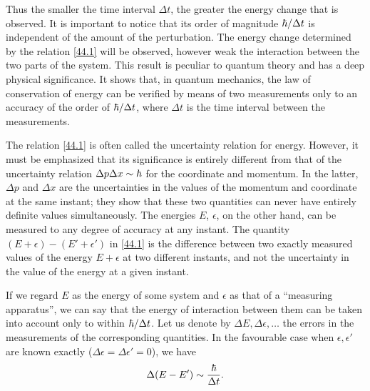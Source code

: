 Thus the smaller the time interval $ \Delta t $, the greater the energy change that is observed. It is important to notice that its order of magnitude $ \hbar/\Delta t $ is independent of the amount of the perturbation. The energy change determined by the relation \eqref{44.1} will be observed, however weak the interaction between the two parts of the system. This result is peculiar to quantum theory and has a deep physical significance. It shows that, in quantum mechanics, the law of conservation of energy can be verified by means of two measurements only to an accuracy of the order of $ \hbar/\Delta t $, where $ \Delta t $ is the time interval between the measurements.

The relation \eqref{44.1} is often called the uncertainty relation for energy. However, it must be emphasized that its significance is entirely different from that of the uncertainty relation $ \Delta p\Delta x \sim \hbar $ for the coordinate and momentum. In the latter, $ \Delta p $ and $ \Delta x $ are the uncertainties in the values of the momentum and coordinate at the same instant; they show that these two quantities can never have entirely definite values simultaneously. The energies $ E $, $ \epsilon $, on the other hand, can be measured to any degree of accuracy at any instant. The quantity $ (E + \epsilon) - (E' + \epsilon') $ in \eqref{44.1} is the difference between two exactly measured values of the energy $ E + \epsilon $ at two different instants, and not the uncertainty in the value of the energy at a given instant.

If we regard $ E $ as the energy of some system and $ \epsilon $ as that of a “measuring apparatus”, we can say that the energy of interaction between them can be taken into account only to within $ \hbar/\Delta t $. Let us denote by $ \Delta E ,  \Delta \epsilon,\dots $ the errors in the measurements of the corresponding quantities. In the favourable case when $ \epsilon, \epsilon' $ are known exactly ($ \Delta\epsilon =\Delta\epsilon' = 0 $), we have
\begin{equation}\label{44.2}
\Delta(E-E')\sim\frac{\hbar}{\Delta t}.
\end{equation}



